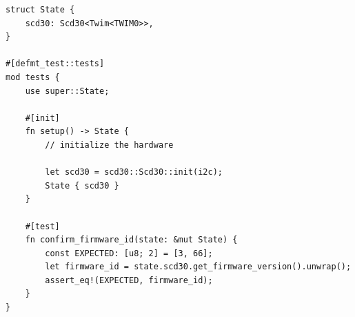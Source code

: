 \begin{lstlisting}[caption={Integration test written using defmt-test\cite{knurling_project_knurling-rsdefmt_2021}.},label=lst:defmttest]
struct State {
    scd30: Scd30<Twim<TWIM0>>,
}

#[defmt_test::tests]
mod tests {
    use super::State;

    #[init]
    fn setup() -> State {
        // initialize the hardware

        let scd30 = scd30::Scd30::init(i2c);
        State { scd30 }
    }

    #[test]
    fn confirm_firmware_id(state: &mut State) {
        const EXPECTED: [u8; 2] = [3, 66];
        let firmware_id = state.scd30.get_firmware_version().unwrap();
        assert_eq!(EXPECTED, firmware_id);
    }
}
\end{lstlisting}

